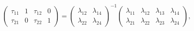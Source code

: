 \begin{equation*}
\begin{pmatrix} \tau_{11} & 1 & \tau_{12} & 0 \\
          \tau_{21} & 0 & \tau_{22} & 1 \end{pmatrix}
                   =  \begin{pmatrix} \lambda_{12} & \lambda_{14} \\
            \lambda_{22} & \lambda_{24} \end{pmatrix}^{-1}
            \begin{pmatrix}
           \lambda_{11}& \lambda_{12} &
             \lambda_{13} & \lambda_{14} \\
           \lambda_{21} & \lambda_{22} &
           \lambda_{23} & \lambda_{24}
            \end{pmatrix} ,
\end{equation*}

